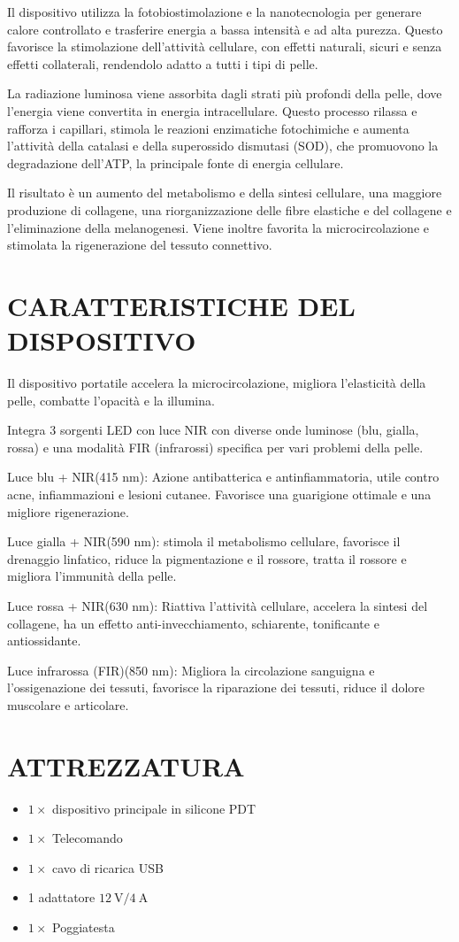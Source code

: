 \documentclass[a4paper]{article}
\begin{document}
Il dispositivo utilizza la fotobiostimolazione e la nanotecnologia per generare calore controllato e trasferire energia a bassa intensità e ad alta purezza. Questo favorisce la stimolazione dell'attività cellulare, con effetti naturali, sicuri e senza effetti collaterali, rendendolo adatto a tutti i tipi di pelle.

La radiazione luminosa viene assorbita dagli strati più profondi della pelle, dove l'energia viene convertita in energia intracellulare. Questo processo rilassa e rafforza i capillari, stimola le reazioni enzimatiche fotochimiche e aumenta l'attività della catalasi e della superossido dismutasi (SOD), che promuovono la degradazione dell'ATP, la principale fonte di energia cellulare.

Il risultato è un aumento del metabolismo e della sintesi cellulare, una maggiore produzione di collagene, una riorganizzazione delle fibre elastiche e del collagene e l'eliminazione della melanogenesi. Viene inoltre favorita la microcircolazione e stimolata la rigenerazione del tessuto connettivo.

\section{CARATTERISTICHE DEL DISPOSITIVO}
Il dispositivo portatile accelera la microcircolazione, migliora l'elasticità della pelle, combatte l'opacità e la illumina.

Integra 3 sorgenti LED con luce NIR con diverse onde luminose (blu, gialla, rossa) e una modalità FIR (infrarossi) specifica per vari problemi della pelle.

Luce blu + NIR(415 nm): Azione antibatterica e antinfiammatoria, utile contro acne, infiammazioni e lesioni cutanee. Favorisce una guarigione ottimale e una migliore rigenerazione.

Luce gialla + NIR(590 nm): stimola il metabolismo cellulare, favorisce il drenaggio linfatico, riduce la pigmentazione e il rossore, tratta il rossore e migliora l'immunità della pelle.

Luce rossa + NIR(630 nm): Riattiva l'attività cellulare, accelera la sintesi del collagene, ha un effetto anti-invecchiamento, schiarente, tonificante e antiossidante.

Luce infrarossa (FIR)(850 nm): Migliora la circolazione sanguigna e l'ossigenazione dei tessuti, favorisce la riparazione dei tessuti, riduce il dolore muscolare e articolare.

\section{ATTREZZATURA}
\begin{itemize}
	\item $1 \times$ dispositivo principale in silicone PDT
	\item $1 \times$ Telecomando
	\item $1 \times$ cavo di ricarica USB
	\item 1 adattatore $12 \mathrm{~V} / 4 \mathrm{~A}$
	\item $1 \times$ Poggiatesta
\end{itemize}
\end{document}
